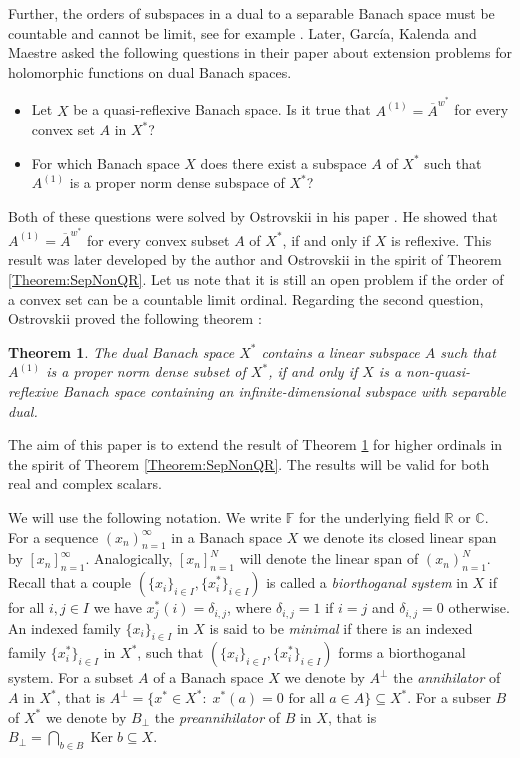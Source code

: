 \documentclass{amsart}
\newtheorem{theorem}{Theorem}[section]
\theoremstyle{definition}
\begin{document}
Further, the orders of subspaces in a dual to a separable Banach space must be countable and cannot be limit, see for example \cite{HumphreysSimpson}. Later, García, Kalenda and Maestre \cite{GarciaKalendaMaestre2010} asked the following questions in their paper about extension problems for holomorphic functions on dual Banach spaces.
\begin{itemize}
    \item Let $X$ be a quasi-reflexive Banach space. Is it true that $A^{(1)} = \overline{A}^{w^*}$ for every convex set $A$ in $X^*$?
    \item For which Banach space $X$ does there exist a subspace $A$ of $X^*$ such that $A^{(1)}$ is a proper norm dense subspace of $X^*$?
\end{itemize}
Both of these questions were solved by Ostrovskii in his paper \cite{Ostrovskii2011}. He showed that $A^{(1)} = \overline{A}^{w^*}$ for every convex subset $A$ of $X^*$, if and only if $X$ is reflexive. This result was later developed by the author \cite{Silber2021Conv} and Ostrovskii \cite{Ostro2022} in the spirit of Theorem \ref{Theorem:SepNonQR}. Let us note that it is still an open problem if the order of a convex set can be a countable limit ordinal. Regarding the second question, Ostrovskii proved the following theorem \cite[Theorem 1]{Ostrovskii2011}:

\begin{theorem} \label{Theorem:NonQRCont}
    The dual Banach space $X^*$ contains a linear subspace $A$ such that $A^{(1)}$ is a proper norm dense subset of $X^*$, if and only if $X$ is a non-quasi-reflexive Banach space containing an infinite-dimensional subspace with separable dual.
\end{theorem}

The aim of this paper is to extend the result of Theorem \ref{Theorem:NonQRCont} for higher ordinals in the spirit of Theorem \ref{Theorem:SepNonQR}. The results will be valid for both real and complex scalars.

We will use the following notation. We write $\mathbb{F}$ for the underlying field $\mathbb{R}$ or $\mathbb{C}$. For a sequence $(x_n)_{n=1}^\infty$ in a Banach space $X$ we denote its closed linear span by $[x_n]_{n=1}^\infty$. Analogically, $[x_n]_{n=1}^N$ will denote the linear span of $(x_n)_{n=1}^N$. Recall that a couple $(\{x_i\}_{i \in I},\{x_i^*\}_{i \in I})$ is called a \textit{biorthoganal system} in $X$ if for all $i,j \in I$ we have $x_j^*(i) = \delta_{i,j}$, where $\delta_{i,j} = 1$ if $i = j$ and $\delta_{i,j} = 0$ otherwise. An indexed family $\{x_i\}_{i \in I}$ in $X$ is said to be \textit{minimal} if there is an indexed family $\{x^*_i\}_{i \in I}$ in $X^*$, such that $(\{x_i\}_{i \in I},\{x_i^*\}_{i \in I})$ forms a biorthoganal system. For a subset $A$ of a Banach space $X$ we denote by $A^\perp$ the \textit{annihilator} of $A$ in $X^*$, that is $A^\perp =  \{x^* \in X^*: \; x^*(a) = 0 \text{ for all } a \in A\} \subseteq X^*$. For a subser $B$ of $X^*$ we denote by $B_\perp$ the \textit{preannihilator} of $B$ in $X$, that is $B_\perp = \bigcap_{b \in B} \operatorname{Ker}b \subseteq X$.
\end{document}
